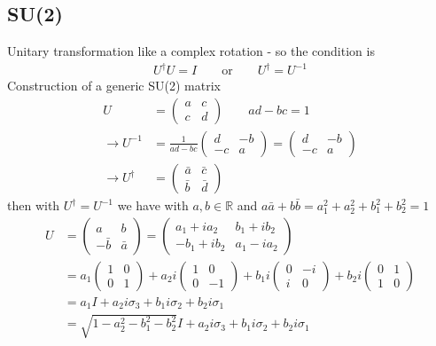 \documentclass[10pt,a4paper]{book}
\theoremstyle{definition}
\begin{document}
\subsection{SU(2)}
Unitary transformation like a complex rotation - so the condition is
\begin{align*}
U^\dagger U=I\qquad \text{or}\qquad U^\dagger=U^{-1}
\end{align*}
Construction of a generic SU(2) matrix
\begin{align*}
U&=\left(
\begin{matrix}
a & c\\
c & d
\end{matrix}
\right)\qquad ad-bc=1\\
\rightarrow U^{-1}&=\frac{1}{ad-bc}\left(
\begin{matrix}
d & -b\\
-c & a
\end{matrix}
\right)=\left(\begin{matrix}
d & -b\\
-c & a
\end{matrix}
\right)\\
\rightarrow U^\dagger&=\left(
\begin{matrix}
\bar{a} & \bar{c}\\
\bar{b} & \bar{d}
\end{matrix}
\right)
\end{align*}
then with $U^\dagger=U^{-1}$ we have with $a,b \in \mathbb{R}$ and $a\bar{a}+b\bar{b}=a_1^2+a_2^2+b_1^2+b_2^2=1$
\begin{align*}
U&=\left(\begin{matrix}
a & b\\
-\bar{b} & \bar{a}
\end{matrix}
\right)
=\left(\begin{matrix}
a_1+ia_2 & b_1+ib_2\\
-b_1+ib_2 & a_1-ia_2
\end{matrix}
\right)\\
&=a_1\left(\begin{matrix}
1 & 0\\
0 & 1
\end{matrix}
\right)+
a_2i\left(\begin{matrix}
1 & 0\\
0 & -1
\end{matrix}
\right)+
b_1i\left(\begin{matrix}
0 & -i\\
i & 0
\end{matrix}
\right)
+
b_2i\left(\begin{matrix}
0 & 1\\
1 & 0
\end{matrix}
\right)\\
&=a_1I+a_2 i\sigma_3+b_1i\sigma_2+b_2i\sigma_1\\
&=\sqrt{1-a_2^2-b_1^2-b_2^2}I+a_2 i\sigma_3+b_1i\sigma_2+b_2i\sigma_1
\end{align*}
\end{document}
